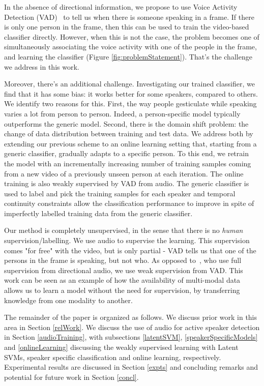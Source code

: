\documentclass[runningheads]{llncs}
\begin{document}
In the absence of directional information, we propose to use Voice Activity Detection (VAD)~\cite{Germain13} to tell us when there is someone speaking in a frame. If there is only one person in the frame, then this can be used to train the video-based classifier directly. However, when this is not the case, the problem becomes one of simultaneously associating the voice activity with one of the people in the frame, and learning the classifier (Figure \ref{fig:problemStatement}). That's the challenge we address in this work.

Moreover, there's an additional challenge. Investigating our trained classifier, we find that it has some bias: it works better for some speakers, compared to others. We identify two reasons for this. First, the way people gesticulate while speaking varies a lot from person to person. Indeed, a person-specific model typically
outperforms the generic model. 
Second, there is the domain shift problem: the change of data distribution between training and test data. We address both by extending our previous scheme to an online learning setting that, starting from a generic classifier, gradually adapts to a specific person. To this end, we retrain the model with an incrementally increasing number of training samples coming from a new video of a previously unseen person at each iteration. The online training is also weakly supervised by VAD from audio. The generic classifier is used to label and pick the training samples for each speaker and temporal continuity constraints allow the classification performance to improve in spite of imperfectly labelled training data from the generic classifier.



Our method is completely unsupervised, in the sense that there is no \emph{human} supervision/labelling. We use audio to supervise the learning. This supervision comes "for free" with the video, but is only partial - VAD tells us that one of the persons in the frame is speaking, but not who. As opposed to~\cite{Chakravarty15}, who use full supervision from directional audio, we use weak supervision from VAD.
This work can be seen as an example of how the availability of multi-modal data allows us to learn a model without the need for supervision, by transferring knowledge from one modality to another.

The remainder of the paper is organized as follows.
We discuss prior work in this area in Section \ref{relWork}. We discuss the use of audio for active speaker detection in Section \ref{audioTraining}, with subsections \ref{latentSVM}, \ref{speakerSpecificModels} and \ref{onlineLearning} discussing the weakly supervised learning with Latent SVMs, speaker specific classification and online learning, respectively. Experimental results are discussed in  Section \ref{expts} and concluding remarks and potential for future work in Section \ref{concl}.
\end{document}

